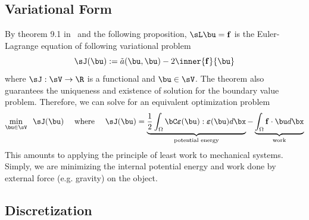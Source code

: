 \documentclass[11pt,titlepage]{article}
\newcommand{\bepsilon}{\boldsymbol{\varepsilon}}
\renewcommand{\bf}{\mathbf{f}}
\newcommand{\ta}{\tilde{a}}
\begin{document}
\subsection{Variational Form}
By theorem 9.1 in~\cite{iserles_2009} and the following proposition, $\sL \bu = \bf$ is the Euler-Lagrange equation of following variational problem
\[
    \sJ(\bu) := \ta(\bu,\bu) - 2\inner{\bf}{\bu}
\]
where $\sJ: \sV\to \R$ is a functional and $\bu\in\sV$. The theorem also guarantees the uniqueness and existence of solution for the boundary value problem. Therefore, we can solve for an equivalent optimization problem
\[
    \min_{\bu\in \sV} \;\; \sJ(\bu)
    \quad \text{ where } \quad
    \sJ(\bu) = 
        \underbrace{\frac{1}{2}\int_{\Omega} \bC \bepsilon(\bu) : \bepsilon(\bu) d\bx }_\text{potential energy}
      - \underbrace{\int_{\Omega} \bf \cdot\bu d\bx}_\text{work}
\]
This amounts to applying the principle of least work to mechanical systems. Simply, we are minimizing the internal potential energy and work done by external force (e.g. gravity) on the object. 

\subsection{Discretization}
\end{document}
